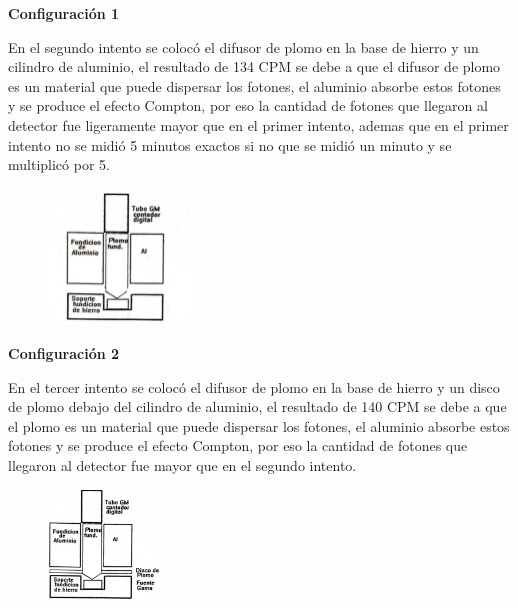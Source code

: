 \documentclass[a4paper]{article}
\begin{document}
    \begin{center}
        \textbf{Configuración 1}\\
    \end{center}

    \saltoPag

    \indent En el segundo intento se colocó el difusor de plomo en la base de hierro y un cilindro de aluminio, el resultado de 134 CPM se debe a que el difusor de plomo es un material que puede dispersar los fotones, el aluminio absorbe estos fotones y se produce el efecto Compton, por eso la cantidad de fotones que llegaron al detector fue ligeramente mayor que en el primer intento, ademas que en el primer intento no se midió 5 minutos exactos si no que se midió un minuto y se multiplicó por 5.\\

    \begin{figure}[h!]
        \centering
        \includegraphics[width=4cm]{../imagenes/imagen2.png}
        \vspace{-5mm}
    \end{figure}

    \begin{center}
        \textbf{Configuración 2}\\
    \end{center}

    \indent En el tercer intento se colocó el difusor de plomo en la base de hierro y un disco de plomo debajo del cilindro de aluminio, el resultado de 140 CPM se debe a que el plomo es un material que puede dispersar los fotones, el aluminio absorbe estos fotones y se produce el efecto Compton, por eso la cantidad de fotones que llegaron al detector fue mayor que en el segundo intento.\\

    \begin{figure}[h!]
        \centering
        \includegraphics[width=3cm]{../imagenes/imagen3a.png}
        \vspace{-5mm}
    \end{figure}
\end{document}
